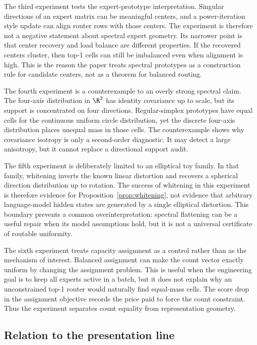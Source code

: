 The third experiment tests the expert-prototype interpretation. Singular
directions of an expert matrix can be meaningful centers, and a power-iteration
style update can align router rows with those centers. The experiment is
therefore not a negative statement about spectral expert geometry. Its narrower
point is that center recovery and load balance are different properties. If the
recovered centers cluster, then top-1 cells can still be imbalanced even when
alignment is high. This is the reason the paper treats spectral prototypes as a
construction rule for candidate centers, not as a theorem for balanced routing.

The fourth experiment is a counterexample to an overly strong spectral claim.
The four-axis distribution in $\R^2$ has identity covariance up to scale, but
its support is concentrated on four directions. Regular-simplex prototypes have
equal cells for the continuous uniform circle distribution, yet the discrete
four-axis distribution places unequal mass in those cells. The counterexample
shows why covariance isotropy is only a second-order diagnostic. It may detect a
large anisotropy, but it cannot replace a directional support audit.

The fifth experiment is deliberately limited to an elliptical toy family. In
that family, whitening inverts the known linear distortion and recovers a
spherical direction distribution up to rotation. The success of whitening in
this experiment is therefore evidence for Proposition~\ref{prop:whitening}, not
evidence that arbitrary language-model hidden states are generated by a single
elliptical distortion. This boundary prevents a common overinterpretation:
spectral flattening can be a useful repair when its model assumptions hold, but
it is not a universal certificate of routable uniformity.

The sixth experiment treats capacity assignment as a control rather than as the
mechanism of interest. Balanced assignment can make the count vector exactly
uniform by changing the assignment problem. This is useful when the engineering
goal is to keep all experts active in a batch, but it does not explain why an
unconstrained top-1 router would naturally find equal-mass cells. The score
drop in the assignment objective records the price paid to force the count
constraint. Thus the experiment separates count equality from representation
geometry.

\subsection{Relation to the presentation line}

